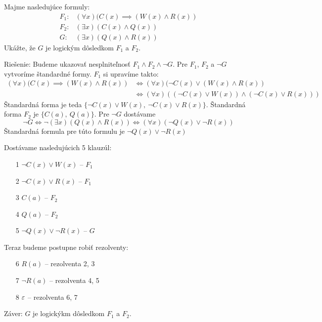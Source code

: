 \begin{priklad}
    Majme nasledujúce formuly:
    \begin{align*}
        F_1: &(\forall x) (C(x) \implies (W(x) \land R(x))\\
        F_2: &(\exists x) (C(x) \land Q(x)) \\
        G:   &(\exists x) (Q(x) \land R(x))
    \end{align*}
    Ukážte, že $G$ je logickým dôsledkom $F_1$ a $F_2$.

    Riešenie: Budeme ukazovať nesplniteľnosť $F_1 \land F_2 \land \neg G$.
    Pre $F_1$, $F_2$ a $\neg G$ vytvoríme štandardné formy.
    $F_1$ si upravíme takto:
    \begin{equation*}
    \begin{split}
        (\forall x) (C(x) \implies (W(x) \land R(x))
        & \iff (\forall x)(\neg C(x) \lor (W(x)\land R(x)) \\
        & \iff (\forall x) ((\neg C(x) \lor W(x)) \land (\neg C(x) \lor R(x)))
    \end{split}
    \end{equation*}
    Štandardná forma je teda 
    $\{\neg C(x) \lor W(x),\ \neg C(x) \lor R(x)\}$.
    Štandardná forma $F_2$ je $\{C(a),\ Q(a)\}$.
    Pre $\neg G$ dostávame
    \begin{equation*}
        \neg G \iff \neg (\exists x)(Q(x)\land R(x)) \iff 
            (\forall x) (\neg Q(x) \lor \neg R(x))
    \end{equation*}
    Štandardná formula pre túto formulu je $\neg Q(x) \lor \neg R(x)$

    Dostávame nasledujúcich 5 klauzúl:
    \begin{itemize}
        \item[1] $\neg C(x) \lor W(x)$ -- $F_1$
        \item[2] $\neg C(x) \lor R(x)$ -- $F_1$
        \item[3] $C(a)$ -- $F_2$
        \item[4] $Q(a)$ -- $F_2$
        \item[5] $\neg Q(x) \lor \neg R(x)$ -- $G$
    \end{itemize}

    Teraz budeme postupne robiť rezolventy:
    \begin{itemize}
        \item[6] $R(a)$ -- rezolventa 2, 3
        \item[7] $\neg R(a)$ -- rezolventa 4, 5
        \item[8] $\varepsilon$ -- rezolventa 6, 7
    \end{itemize}

    \noindent
    Záver: $G$ je logickýkm dôsledkom $F_1$ a $F_2$.
\end{priklad}


